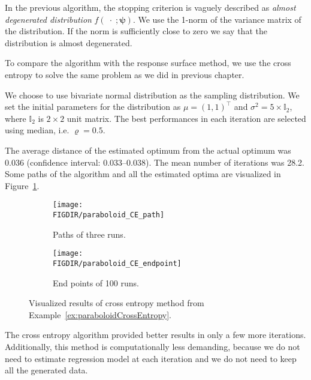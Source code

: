 In the previous algorithm, the stopping criterion is vaguely described as \emph{almost degenerated distribution} $f( \;\cdot\; ; \bm{\psi})$. We use the 1-norm of the variance matrix of the distribution. If the norm is sufficiently close to zero we say that the distribution is almost degenerated.

To compare the algorithm with the response surface method, we use the cross entropy to solve the same problem as we did in previous chapter.

\begin{example}
	\label{ex:paraboloidCrossEntropy} 
	We choose to use bivariate normal distribution as the sampling distribution. We set the initial parameters for the distribution as $\mu = (1,1)^{\top}$ and $\sigma^2 = 5 \times \mathbb{I}_2$, where $\mathbb{I}_2$ is $2 \times 2$ unit matrix. The best performances in each iteration are selected using median, i.e. $\varrho = 0.5$.
	
	The average distance of the estimated optimum from the actual optimum was 0.036 (confidence interval: 0.033--0.038). The mean number of iterations was 28.2. Some paths of the algorithm and all the estimated optima are visualized in Figure~\ref{fig:paraboloidCE}.
	
	\begin{figure}[t]
		\centering
		
			\begin{subfigure}[b]{0.45\textwidth}
				\centering
				\texttt{[image: \\FIGDIR/paraboloid\_CE\_path]}
				\caption{Paths of three runs.}
			\end{subfigure}
			\hfill
			\begin{subfigure}[b]{0.45\textwidth}
				\centering
				\texttt{[image: \\FIGDIR/paraboloid\_CE\_endpoint]}
				\caption{End points of 100 runs.}
			\end{subfigure}

		\caption{Visualized results of cross entropy method from Example~\ref{ex:paraboloidCrossEntropy}.}
		\label{fig:paraboloidCE}
	\end{figure}
		
	The cross entropy algorithm provided better results in only a few more iterations. Additionally, this method is computationally less demanding, because we do not need to estimate regression model at each iteration and we do not need to keep all the generated data.

	\demo
\end{example}

